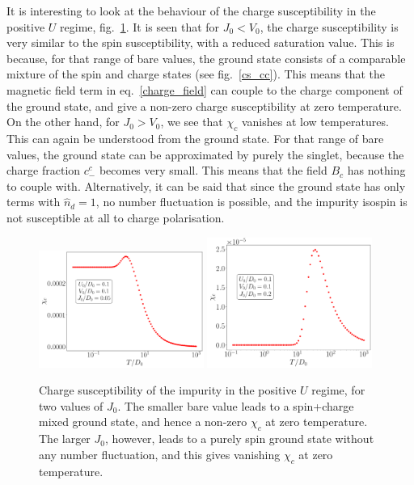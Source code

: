 \documentclass{report}
\numberwithin{equation}{section}
\begin{document}
It is interesting to look at the behaviour of the charge susceptibility in the positive \(U\) regime, fig.~\ref{chi_charge_posU}. It  is seen that for \(J_0<V_0\), the charge susceptibility is very similar to the spin susceptibility, with a reduced saturation value. This is because, for that range of bare values, the ground state consists of a comparable mixture of the spin and charge states (see fig.~\ref{cs_cc}). This means that the magnetic field term in eq.~\eqref{charge_field} can couple to the charge component of the ground state, and give a non-zero charge susceptibility at zero temperature. On the other hand, for \(J_0 > V_0\), we see that \(\chi_c\) vanishes at low temperatures. This can again be understood from the ground state. For that range of bare values, the ground state can be approximated by purely the singlet, because the charge fraction \(c_-^c\) becomes very small. This means that the field \(B_c \) has nothing to couple with. Alternatively, it can be said that since the ground state has only terms with \(\hat n_d=1\), no number fluctuation is possible, and the impurity isospin is not susceptible at all to charge polarisation.
\begin{figure}[htpb]
	\centering
	\includegraphics[width=0.48\textwidth]{../figures/chiC_posU_J=small.pdf}
	\includegraphics[width=0.48\textwidth]{../figures/chiC_posU_J=large.pdf}
	\caption{Charge susceptibility of the impurity in the positive \(U\) regime, for two values of \(J_0\). The smaller bare value leads to a spin+charge mixed ground state, and hence a non-zero \(\chi_c\) at zero temperature. The larger \(J_0\), however, leads to a purely spin ground state without any number fluctuation, and this gives vanishing \(\chi_c\) at zero temperature.}
	\label{chi_charge_posU}
\end{figure}
\end{document}
